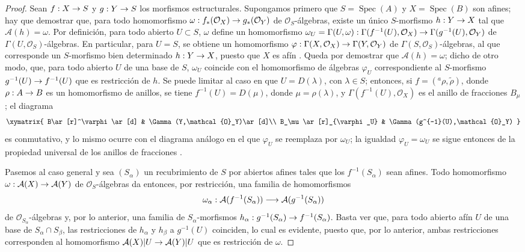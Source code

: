 \documentclass[oneside,10pt]{amsart}
\makeatletter
\newcommand{\ega@arrow}[2]{\mathchoice{#1}{#2}{#2}{#2}}
\renewcommand{\to}{\ega@arrow{\longrightarrow}{\rightarrow}}
\newcommand{\oldpage}[2][]{\marginnote{\normalfont\footnotesize\textbf{#1}~|~#2}\ignorespaces}
\makeatother
\begin{document}
\begin{proof}
Sean $f:X\to S$ y $g:Y\to S$ los morfismos estructurales.
Supongamos primero que $S=\operatorname{Spec}(A)$ y $X=\operatorname{Spec}(B)$ son afines; hay que demostrar que, para todo homomorfismo $\omega:f_*(\mathcal{O}_X)\to g_*(\mathcal{O}_Y)$ de $\mathcal{O}_S$-álgebras, existe un único $S$-morfismo $h:Y\to X$ tal que $\mathcal{A}(h)=\omega$.
Por definición, para todo abierto $U\subset
S$, $\omega$ define un homomorfismo
$\omega_U=\Gamma(U,\omega):\Gamma(f^{-1}(U),\mathcal{O}_X)\to\Gamma(g^{-1}(U),\mathcal{O}_Y)$
de $\Gamma(U,\mathcal{O}_S)$-álgebras.
En particular, para $U=S$, se obtiene un homomorfismo $\varphi:\Gamma(X,\mathcal{O}_X)\to\Gamma(Y,\mathcal{O}_Y)$ de $\Gamma(S,\mathcal{O}_S)$-álgebras, al que corresponde un $S$-morfismo bien determinado $h:Y\to X$, puesto que $X$ es afín .
Queda por demostrar que $\mathcal{A}(h)=\omega$; dicho de otro modo, que, para todo abierto $U$ de una base de $S$, $\omega_U$ coincide con el homomorfismo de álgebras $\varphi_U$ correspondiente al $S$-morfismo $g^{-1}(U)\to f^{-1}(U)$ que es restricción de $h$.
Se puede limitar al caso en que $U=D(\lambda)$, con $\lambda\in S$; entonces, si $f=({}^a\rho,\widetilde{\rho})$, donde $\rho:A\to B$ es un homomorfismo de anillos, se tiene $f^{-1}(U)=D(\mu)$, donde $\mu=\rho(\lambda)$, y $\Gamma(f^{-1}(U),\mathcal{O}_X)$ es el anillo de fracciones $B_\mu$; el diagrama
\[
  \xymatrix{
    B\ar[r]^\varphi\ar[d] & \Gamma(Y,\mathcal{O}_Y)\ar[d]\\
    B_\mu\ar[r]_{\varphi_U} & \Gamma(g^{-1}(U),\mathcal{O}_Y)
  }
\]
es conmutativo, y lo mismo ocurre con el diagrama análogo en el que $\varphi_U$ se reemplaza por $\omega_U$; la igualdad $\varphi_U=\omega_U$ se sigue entonces de la propiedad universal de los anillos de fracciones .

Pasemos al caso general y sea $(S_\alpha)$ un recubrimiento de $S$ por abiertos afines
\oldpage[II]{8}
tales que los $f^{-1}(S_\alpha)$ sean afines.
Todo homomorfismo $\omega:\mathcal{A}(X)\to\mathcal{A}(Y)$ de $\mathcal{O}_S$-álgebras da entonces, por restricción, una familia de homomorfismos
\[
  \omega_\alpha:
  \mathcal{A}(f^{-1}(S_\alpha))\to
  \mathcal{A}(g^{-1}(S_\alpha))
\]
de $\mathcal{O}_{S_\alpha}$-álgebras y, por lo anterior, una familia de $S_\alpha$-morfismos $h_\alpha:g^{-1}(S_\alpha)\to f^{-1}(S_\alpha)$.
Basta ver que, para todo abierto afín $U$ de una base de $S_\alpha\cap S_\beta$, las restricciones de $h_\alpha$ y $h_\beta$ a $g^{-1}(U)$ coinciden, lo cual es evidente, puesto que, por lo anterior, ambas restricciones corresponden al homomorfismo $\mathcal{A}(X)|U\to\mathcal{A}(Y)|U$ que es restricción de $\omega$.
\end{proof}
\end{document}
